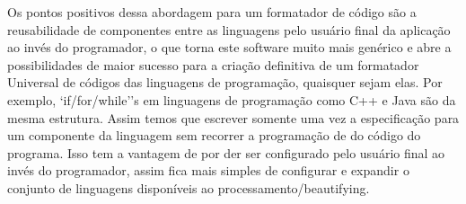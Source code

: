     Os pontos positivos dessa abordagem para um formatador de código são a reusabilidade de
    componentes entre as linguagens pelo usuário final da aplicação ao invés do programador, o que
    torna este software muito mais genérico e abre a possibilidades de maior sucesso para a criação
    definitiva de um formatador Universal de códigos das linguagens de programação, quaisquer sejam
    elas. Por exemplo, `if/for/while''s em linguagens de programação como C++ e Java são da mesma
    estrutura. Assim temos que escrever somente uma vez a especificação para um componente da
    linguagem sem recorrer a programação de do código do programa. Isso tem a vantagem de por der
    ser configurado pelo usuário final ao invés do programador, assim fica mais simples de
    configurar e expandir o conjunto de linguagens disponíveis ao processamento/beautifying.






